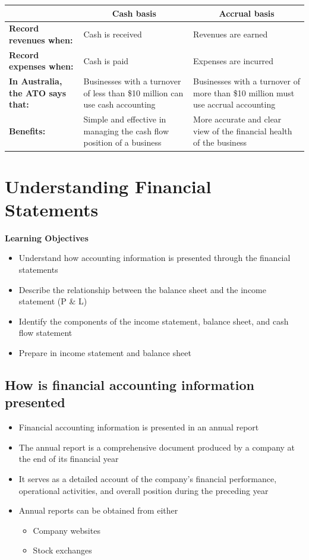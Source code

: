 \documentclass{article}
\begin{document}
		\begin{table}[H]
			\centering
			\begin{tabular}{p{4cm}|p{6cm}|p{6cm}}
				\hline
				\multicolumn{1}{c|}{} & 
				\multicolumn{1}{c|}{\textbf{Cash basis}} & 
				\multicolumn{1}{c}{\textbf{Accrual basis}} \\
				\hline
				\textbf{Record revenues when:} & Cash is received 	& Revenues are earned \\
				\textbf{Record expenses when:} & Cash is paid		& Expenses are incurred \\
				\textbf{In Australia, the ATO says that:}			& Businesses with a turnover of less than \$10 million can use cash accounting		& Businesses with a turnover of more than \$10 million must use accrual accounting \\
				\textbf{Benefits:}									& Simple and effective in managing the cash flow position of a business				& More accurate and clear view of the financial health of the business \\
				\hline
			\end{tabular}
		\end{table}

\section{Understanding Financial Statements}
	
	\textbf{Learning Objectives}
		\begin{itemize}
			\item Understand how accounting information is presented through the financial statements
			\item Describe the relationship between the balance sheet and the income statement (P \& L)
			\item Identify the components of the income statement, balance sheet, and cash flow statement
			\item Prepare in income statement and balance sheet
		\end{itemize}

	\subsection{How is financial accounting information presented}
		\begin{itemize}
			\item Financial accounting information is presented in an annual report
			\item The annual report is a comprehensive document produced by a company at the end of its financial year
			\item It serves as a detailed account of the company's financial performance, operational activities, and overall position during the preceding year
			\item Annual reports can be obtained from either
				\begin{itemize}
					\item Company websites
					\item Stock exchanges
				\end{itemize}
		\end{itemize}
\end{document}
